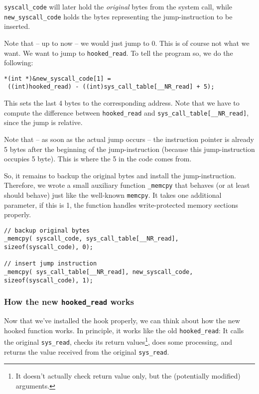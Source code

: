 \documentclass[10pt, letterpaper]{scrartcl}
\begin{document}
\texttt{syscall\_code} will later hold the \emph{original} bytes from the system call, while \texttt{new\_syscall\_code} holds the bytes representing the jump-instruction to be inserted. 

Note that -- up to now -- we would just jump to 0. This is of course not what we want. We want to jump to \texttt{hooked\_read}. To tell the program so, we do the following:

\begin{verbatim}
*(int *)&new_syscall_code[1] = 
 ((int)hooked_read) - ((int)sys_call_table[__NR_read] + 5);
\end{verbatim}

This sets the last 4 bytes to the corresponding address. Note that we have to compute the difference between \texttt{hooked\_read} and \texttt{sys\_call\_table[\_\_NR\_read]}, since the jump is relative. 

Note that -- as soon as the actual jump occurs -- the instruction pointer is already 5 bytes after the beginning of the jump-instruction (because this jump-instruction occupies 5 byte). This is where the 5 in the code comes from.

So, it remains to backup the original bytes and install the jump-instruction. Therefore, we wrote a small auxiliary function \texttt{\_memcpy} that behaves (or at least should behave) just like the well-known \texttt{memcpy}. It takes one additional parameter, if this is 1, the function handles write-protected memory sections properly.

\begin{verbatim}
// backup original bytes
_memcpy( syscall_code, sys_call_table[__NR_read], sizeof(syscall_code), 0);

// insert jump instruction
_memcpy( sys_call_table[__NR_read], new_syscall_code, sizeof(syscall_code), 1);
\end{verbatim}

\subsubsection{How the new \texttt{hooked\_read} works}
\label{sec:hooked-read-2-technique}

Now that we've installed the hook properly, we can think about how the new hooked function works. In principle, it works like the old \texttt{hooked\_read}: It calls the original \texttt{sys\_read}, checks its return values\footnote{It doesn't actually check return value only, but the (potentially modified) arguments.}, does some processing, and returns the value received from the original \texttt{sys\_read}.
\end{document}
